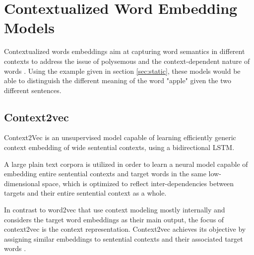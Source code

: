         

    
    \section{Contextualized Word Embedding Models}
    \label{sec:context}    
        \par Contextualized words embeddings aim at capturing word semantics in different contexts to address the issue of polysemous and the context-dependent nature of words \cite{Batista2018}. Using the example given in  section \ref{sec:static}, these models would be able to distinguish the different meaning of the word "apple" given the two different sentences.

        \subsection{Context2vec}
        
            \par Context2Vec is an unsupervised model capable of learning efficiently generic context embedding of wide sentential contexts, using a bidirectional LSTM. 

            A large plain text corpora is utilized in order to learn a neural model capable of embedding  entire  sentential  contexts  and  target words in the same low-dimensional space, which is optimized to reflect inter-dependencies between targets and their entire sentential context as a whole. 
            
            
            In contrast to word2vec that use context modeling mostly internally and considers the target word embeddings as their main output, the focus of context2vec is the context representation. Context2vec achieves its objective by assigning similar embeddings to sentential contexts and their associated target words \cite{Melamud2016}.

